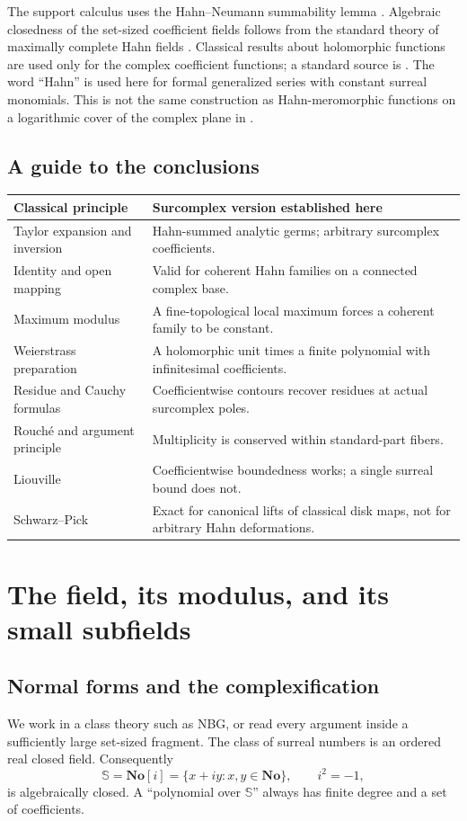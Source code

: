 \documentclass[11pt,a4paper]{article}
\theoremstyle{definition}
\theoremstyle{remark}
\newcommand{\No}{\mathbf{No}}
\newcommand{\SC}{\mathbb S}
\begin{document}
The support calculus uses the Hahn--Neumann summability lemma
\cite{Neumann,PoonenUnits}. Algebraic closedness of the set-sized
coefficient fields follows from the standard theory of maximally
complete Hahn fields \cite{Poonen}. Classical results about holomorphic
functions are used only for the complex coefficient functions; a
standard source is \cite{McMullen}. The word ``Hahn'' is used here for
formal generalized series with constant surreal monomials. This is not
the same construction as Hahn-meromorphic functions on a logarithmic
cover of the complex plane in \cite{MS}.

\subsection{A guide to the conclusions}
\begin{center}
\small
\begin{tabular}{@{}p{}p{}@{}}
\toprule
Classical principle & Surcomplex version established here\\
\midrule
Taylor expansion and inversion & Hahn-summed analytic germs; arbitrary surcomplex coefficients.\\
Identity and open mapping & Valid for coherent Hahn families on a connected complex base.\\
Maximum modulus & A fine-topological local maximum forces a coherent family to be constant.\\
Weierstrass preparation & A holomorphic unit times a finite polynomial with infinitesimal coefficients.\\
Residue and Cauchy formulas & Coefficientwise contours recover residues at actual surcomplex poles.\\
Rouch\'e and argument principle & Multiplicity is conserved within standard-part fibers.\\
Liouville & Coefficientwise boundedness works; a single surreal bound does not.\\
Schwarz--Pick & Exact for canonical lifts of classical disk maps, not for arbitrary Hahn deformations.\\
\bottomrule
\end{tabular}
\end{center}

\section{The field, its modulus, and its small subfields}\label{sec:field}
\subsection{Normal forms and the complexification}
We work in a class theory such as NBG, or read every argument inside a
sufficiently large set-sized fragment. The class of surreal numbers is
an ordered real closed field. Consequently
\[
 \SC=\No[i]=\{x+iy:x,y\in\No\},\qquad i^2=-1,
\]
is algebraically closed. A ``polynomial over $\SC$'' always has finite
degree and a set of coefficients.
\end{document}
